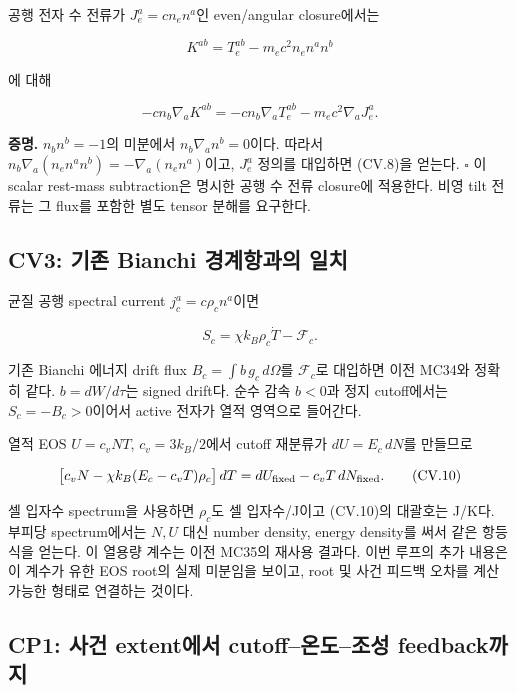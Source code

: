 공행 전자 수 전류가 \(J_e^a=c n_e n^a\)인 even/angular closure에서는

\[
K^{ab}=T_e^{ab}-m_ec^2 n_e n^an^b
\]

에 대해

\[
\boxed{-c n_b\nabla_aK^{ab}
=-c n_b\nabla_aT_e^{ab}-m_ec^2\nabla_aJ_e^a.}
\tag{CV.8}
\]

\textbf{증명.} \(n_bn^b=-1\)의 미분에서 \(n_b\nabla_an^b=0\)이다. 따라서 \(n_b\nabla_a(n_en^an^b)=-\nabla_a(n_en^a)\)이고, \(J_e^a\) 정의를 대입하면 (CV.8)을 얻는다. \(\square\) 이 scalar rest-mass subtraction은 명시한 공행 수 전류 closure에 적용한다. 비영 tilt 전류는 그 flux를 포함한 별도 tensor 분해를 요구한다.

\hypertarget{cv3-uxae30uxc874-bianchi-uxacbduxacc4uxd56duxacfcuxc758-uxc77cuxce58}{%
\subsection{CV3: 기존 Bianchi 경계항과의 일치}\label{cv3-uxae30uxc874-bianchi-uxacbduxacc4uxd56duxacfcuxc758-uxc77cuxce58}}

균질 공행 spectral current \(j_c^a=c\rho_c n^a\)이면

\[
S_c=\chi k_B\rho_c\dot T-\mathcal F_c.
\tag{CV.9}
\]

기존 Bianchi 에너지 drift flux \(B_c=\int b\,g_c\,d\Omega\)를 \(\mathcal F_c\)로 대입하면 이전 MC34와 정확히 같다. \(b=dW/d\tau\)는 signed drift다. 순수 감속 \(b<0\)과 정지 cutoff에서는 \(S_c=-B_c>0\)이어서 active 전자가 열적 영역으로 들어간다.

열적 EOS \(U=c_vNT\), \(c_v=3k_B/2\)에서 cutoff 재분류가 \(dU=E_c\,dN\)를 만들므로

\[
\big[c_vN-\chi k_B(E_c-c_vT)\rho_c\big]\,dT
=dU_{\rm fixed}-c_vT\,dN_{\rm fixed}.
\tag{CV.10}
\]

셀 입자수 spectrum을 사용하면 \(\rho_c\)도 셀 입자수/J이고 (CV.10)의 대괄호는 J/K다. 부피당 spectrum에서는 \(N,U\) 대신 number density, energy density를 써서 같은 항등식을 얻는다. 이 열용량 계수는 이전 MC35의 재사용 결과다. 이번 루프의 추가 내용은 이 계수가 유한 EOS root의 실제 미분임을 보이고, root 및 사건 피드백 오차를 계산 가능한 형태로 연결하는 것이다.

\hypertarget{cp1-uxc0acuxac74-extentuxc5d0uxc11c-cutoffuxc628uxb3c4uxc870uxc131-feedbackuxae4cuxc9c0}{%
\subsection{CP1: 사건 extent에서 cutoff--온도--조성 feedback까지}\label{cp1-uxc0acuxac74-extentuxc5d0uxc11c-cutoffuxc628uxb3c4uxc870uxc131-feedbackuxae4cuxc9c0}}


